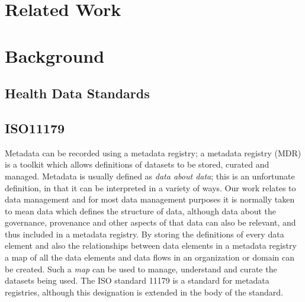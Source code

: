 \documentclass[runningheads]{llncs}
\begin{document}
	
	\section{Related Work}
	
	
	
	
	\section{Background}
	
	
	\subsection{Health Data Standards}
	
	
	\subsection{ISO11179}
		Metadata can be recorded using a metadata registry; a metadata registry (MDR) is a toolkit which allows definitions of datasets to be stored, curated and managed. Metadata is usually defined as \emph{data about data}; this is an unfortunate definition, in that it can be interpreted in a variety of ways. Our work relates to data management and for most data management purposes it is normally taken to mean data which defines the structure of data, although data about the governance, provenance and other aspects of that data can also be relevant, and thus included in a metadata registry. By storing the definitions of every data element and also the relationships between data elements in a metadata registry a map of all the data elements and data flows in an organization or domain can be created. Such a \emph{map} can be used to manage, understand and curate the datasets being used. The ISO standard 11179 is a standard for metadata registries, although this designation is extended in the body of the standard.
	
\end{document}
